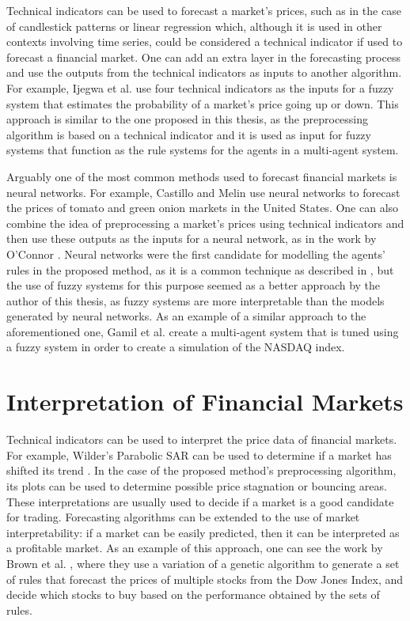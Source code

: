 Technical indicators can be used to forecast a market's prices, such as in the
case of candlestick patterns \cite{Nison1991} or linear regression
\cite{kutner2004applied} which, although it is used in other contexts involving
time series, could be considered a technical indicator if used to forecast a
financial market. One can add an extra layer in the forecasting process and use
the outputs from the technical indicators as inputs to another algorithm. For
example, Ijegwa et al. \cite{Ijegwa2014} use four technical indicators as the
inputs for a fuzzy system that estimates the probability of a market's price
going up or down. This approach is similar to the one proposed in this thesis,
as the preprocessing algorithm is based on a technical indicator and it is used
as input for fuzzy systems that function as the rule systems for the agents in a
multi-agent system.

Arguably one of the most common methods used to forecast financial markets is
neural networks. For example, Castillo and Melin \cite{Castillo2001}
\cite{melin2007hybrid} use neural networks to forecast the prices of tomato and
green onion markets in the United States. One can also combine the idea of
preprocessing a market's prices using technical indicators and then use these
outputs as the inputs for a neural network, as in the work by O'Connor
\cite{Connor2005}. Neural networks were the first candidate for modelling the
agents' rules in the proposed method, as it is a common technique as described
in \cite{Grothmann2002}, but the use of fuzzy systems for this purpose seemed as
a better approach by the author of this thesis, as fuzzy systems are more
interpretable than the models generated by neural networks. As an example of a
similar approach to the aforementioned one, Gamil et al. \cite{Gamil2007} create
a multi-agent system that is tuned using a fuzzy system in order to create a
simulation of the NASDAQ index.

\section{Interpretation of Financial Markets}
\label{section:interpretation-of-financial-markets}

Technical indicators can be used to interpret the price data of financial
markets. For example, Wilder's Parabolic SAR can be used to determine if a
market has shifted its trend \cite{Wilder1978}. In the case of the proposed
method's preprocessing algorithm, its plots can be used to determine possible
price stagnation or bouncing areas. These interpretations are usually used to
decide if a market is a good candidate for trading. Forecasting algorithms can
be extended to the use of market interpretability: if a market can be easily
predicted, then it can be interpreted as a profitable market. As an example of
this approach, one can see the work by Brown et al. \cite{Brown2013}, where they
use a variation of a genetic algorithm to generate a set of rules that forecast
the prices of multiple stocks from the Dow Jones Index, and decide which stocks
to buy based on the performance obtained by the sets of rules.

